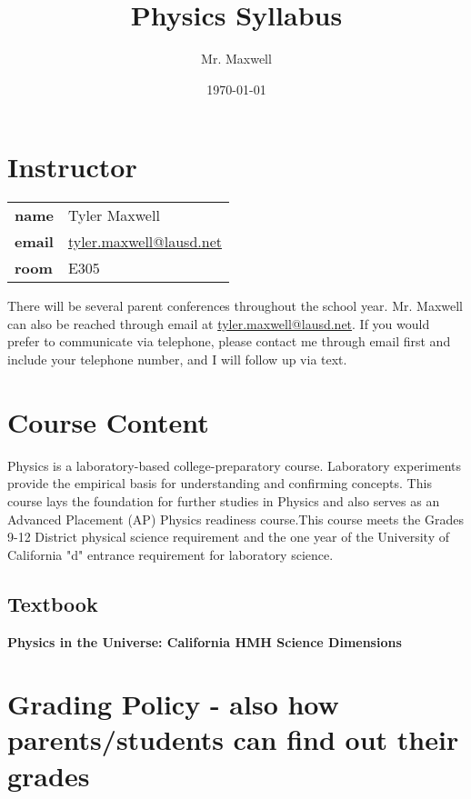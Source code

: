 \documentclass[11pt]{article}
\author{Mr. Maxwell}
\date{\today}
\title{Physics Syllabus}
\begin{document}
\maketitle

\section{Instructor}
\label{sec:orge79d541}

\begin{center}
\begin{tabular}{ll}
\textbf{\textbf{name}} & Tyler Maxwell\\[0pt]
\textbf{\textbf{email}} & \href{mailto:tyler.maxwell@lausd.net}{tyler.maxwell@lausd.net}\\[0pt]
\textbf{\textbf{room}} & E305\\[0pt]
\end{tabular}
\end{center}

There will be several parent conferences throughout the school year. Mr. Maxwell can also be reached through email at \href{mailto:tyler.maxwell@lausd.net}{tyler.maxwell@lausd.net}. If you would prefer to communicate via telephone, please contact me through email first and include your telephone number, and I will follow up via text.

\section{Course Content}
\label{sec:org0241db8}

Physics is a laboratory-based college-preparatory course. Laboratory experiments provide the empirical basis for understanding and confirming concepts. This course lays the foundation for further studies in Physics and also serves as an Advanced Placement (AP) Physics readiness course.This course meets the Grades 9-12 District physical science requirement and the one year of the University of California "d" entrance requirement for laboratory science.

\subsection{Textbook}
\label{sec:org69724b6}

\textbf{\textbf{Physics in the Universe: California HMH Science Dimensions}}

\section{Grading Policy - also how parents/students can find out their grades}
\label{sec:org93bd678}
\end{document}
